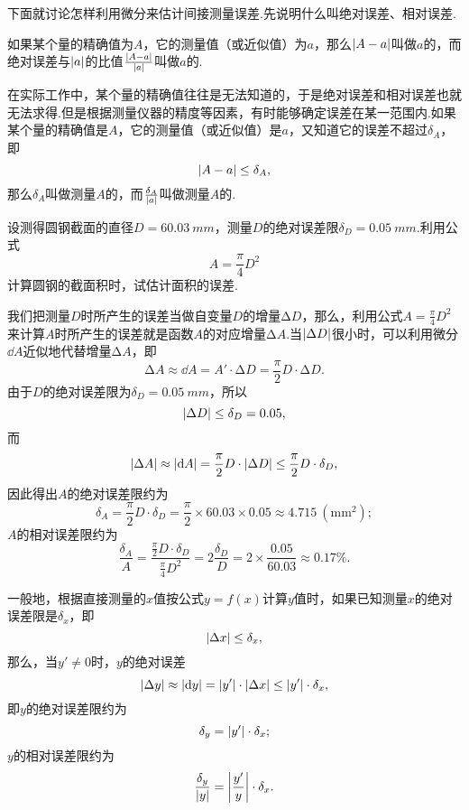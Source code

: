 下面就讨论怎样利用微分来估计间接测量误差.先说明什么叫绝对误差、相对误差.

如果某个量的精确值为\(A\)，它的测量值（或近似值）为\(a\)，那么\(\abs{A-a}\)叫做\(a\)的，而绝对误差与\(\abs{a}\)的比值\(\frac{\abs{A-a}}{\abs{a}}\)叫做\(a\)的.

在实际工作中，某个量的精确值往往是无法知道的，于是绝对误差和相对误差也就无法求得.但是根据测量仪器的精度等因素，有时能够确定误差在某一范围内.如果某个量的精确值是\(A\)，它的测量值（或近似值）是\(a\)，又知道它的误差不超过\(\delta_A\)，即\[
\abs{A-a} \leq \delta_A,
\]那么\(\delta_A\)叫做测量\(A\)的，而\(\frac{\delta_A}{\abs{a}}\)叫做测量\(A\)的.

\begin{example}
设测得圆钢截面的直径\(D = 60.03\ mm\)，测量\(D\)的绝对误差限\(\delta_D = 0.05\ mm\).利用公式\[
A = \frac{\pi}{4} D^2
\]计算圆钢的截面积时，试估计面积的误差.
\begin{solution}
我们把测量\(D\)时所产生的误差当做自变量\(D\)的增量\(\increment D\)，那么，利用公式\(A = \frac{\pi}{4} D^2\)来计算\(A\)时所产生的误差就是函数\(A\)的对应增量\(\increment A\).当\(\abs{\Delta D}\)很小时，可以利用微分\(\dd A\)近似地代替增量\(\increment A\)，即\[
\increment A \approx \dd A = A' \cdot \increment D = \frac{\pi}{2} D \cdot \increment D.
\]由于\(D\)的绝对误差限为\(\delta_D = 0.05\ mm\)，所以\[
\abs{\Delta D} \leq \delta_D = 0.05,
\]而\[
\abs{\Delta A} \approx \abs{\dd A} = \frac{\pi}{2} D \cdot \abs{\Delta D} \leq \frac{\pi}{2} D \cdot \delta_D,
\]因此得出\(A\)的绝对误差限约为\[
\delta_A = \frac{\pi}{2} D \cdot \delta_D = \frac{\pi}{2} \times 60.03 \times 0.05 \approx 4.715\ (\mathrm{mm}^2);
\]\(A\)的相对误差限约为\[
\frac{\delta_A}{A} = \frac{\frac{\pi}{2} D \cdot \delta_D}{\frac{\pi}{4} D^2}
= 2 \frac{\delta_D}{D} = 2 \times \frac{0.05}{60.03} \approx 0.17\%.
\]
\end{solution}
\end{example}

一般地，根据直接测量的\(x\)值按公式\(y = f(x)\)计算\(y\)值时，如果已知测量\(x\)的绝对误差限是\(\delta_x\)，即\[
\abs{\Delta x} \leq \delta_x,
\]那么，当\(y' \neq 0\)时，\(y\)的绝对误差\[
\abs{\Delta y} \approx \abs{\dd{y}} = \abs{y'} \cdot \abs{\Delta x} \leq \abs{y'} \cdot \delta_x,
\]即\(y\)的绝对误差限约为\[
\delta_y = \abs{y'} \cdot \delta_x;
\]\(y\)的相对误差限约为\[
\frac{\delta_y}{\abs{y}} = \abs{\frac{y'}{y}} \cdot \delta_x.
\]

